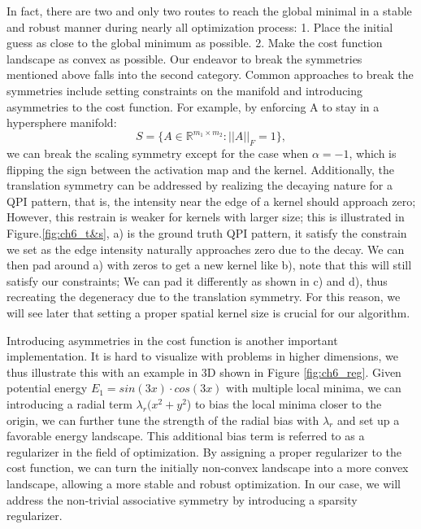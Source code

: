 In fact, there are two and only two routes to reach the global minimal in a stable and robust manner during nearly all optimization process: 1. Place the initial guess as close to the global minimum as possible. 2. Make the cost function landscape as convex as possible. Our endeavor to break the symmetries mentioned above falls into the second category. Common approaches to break the symmetries include setting constraints on the manifold and introducing asymmetries to the cost function. For example, by enforcing A to stay in a hypersphere manifold: 
\begin{equation}
	\label{key}
	S = \{A \in \mathbb{R}^{m_1 \times m_2}: \vert\vert A \vert \vert_{F}= 1\},
\end{equation}
we can break the scaling symmetry except for the case when $\alpha = -1$, which is flipping the sign between the activation map and the kernel. Additionally, the translation symmetry can be addressed by realizing the decaying nature for a QPI pattern, that is, the intensity near the edge of a kernel should approach zero; However, this restrain is weaker for kernels with larger size; this is illustrated in Figure.\ref{fig:ch6_t&s}, a) is the ground truth QPI pattern, it satisfy the constrain we set as the edge intensity naturally approaches zero due to the decay. We can then pad around a) with zeros to get a new kernel like b), note that this will still satisfy our constraints; We can pad it differently as shown in c) and d), thus recreating the degeneracy due to the translation symmetry. For this reason, we will see later that setting a proper spatial kernel size is crucial for our algorithm. 

Introducing asymmetries in the cost function is another important implementation. It is hard to visualize with problems in higher dimensions, we thus illustrate this with an example in 3D shown in Figure \ref{fig:ch6_reg}. Given potential energy $E_1 = sin(3x)\cdot cos(3x)$ with multiple local minima, we can introducing a radial term $\lambda_r(x^2 + y^2$) to bias the local minima closer to the origin, we can further tune the strength of the radial bias with $\lambda_r$ and set up a favorable energy landscape. This additional bias term is referred to as a regularizer in the field of optimization. By assigning a proper regularizer to the cost function, we can turn the initially non-convex landscape into a more convex landscape, allowing a more stable and robust optimization. In our case, we will address the non-trivial associative symmetry by introducing a sparsity regularizer. 

